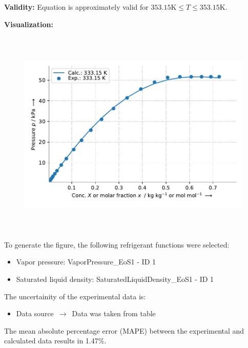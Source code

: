 \textbf{Validity:}
\newline
Equation is approximately valid for $353.15 \si{\kelvin} \leq T \leq 353.15 \si{\kelvin}$.
\newline

\textbf{Visualization:}
%
\begin{figure}[!htp]
{\noindent\includegraphics[height=10cm, keepaspectratio]{figs/abs/abs_Benzene_inoic_liquid_[C2H5NH]+[C2H5OC2H4OSO3]-_NrtlTemperatureDg_1.pdf}}
\end{figure}
%

To generate the figure, the following refrigerant functions were selected:
\begin{itemize}
\item Vapor pressure: VaporPressure\_EoS1 - ID 1
\item Saturated liquid density: SaturatedLiquidDensity\_EoS1 - ID 1
\end{itemize}

The uncertainity of the experimental data is:
\begin{itemize}
\item Data source $\,\to\,$ Data was taken from table
\end{itemize}

The mean absolute percentage error (MAPE) between the experimental and calculated data results in 1.47\%.
\FloatBarrier
\newpage
